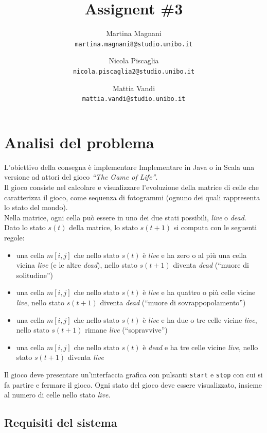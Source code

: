 \documentclass[a4paper]{article}
\title{\LARGE \bf
Assignent \#3
}
\author{
    Martina Magnani\\
    \texttt{martina.magnani8@studio.unibo.it}
    \and
    Nicola Piscaglia\\
    \texttt{nicola.piscaglia2@studio.unibo.it}
    \and
    Mattia Vandi\\
    \texttt{mattia.vandi@studio.unibo.it}
}
\date{}
\begin{document}
\maketitle

\section{Analisi del problema}\label{analisi-del-problema}

L'obiettivo della consegna è implementare Implementare in Java o in Scala una versione ad attori del gioco \textit{``The Game of Life''}.\\
Il gioco consiste nel calcolare e visualizzare l'evoluzione della matrice di celle che caratterizza il gioco, come sequenza di fotogrammi (ognuno dei quali rappresenta lo stato del mondo).\\
Nella matrice, ogni cella può essere in uno dei due stati possibili, \textit{live} o \textit{dead}.\\
Dato lo stato $s\left(t\right)$ della matrice, lo stato $s\left(t + 1\right)$ si computa con le seguenti regole:

\begin{itemize}
\item
  una cella $m\left[i,j\right]$ che nello stato $s\left(t\right)$ è \textit{live} e ha zero o al più una cella vicina \textit{live} (e le altre \textit{dead}), nello stato $s\left(t + 1\right)$ diventa \textit{dead} (``muore di solitudine'')
\item
  una cella $m\left[i,j\right]$ che nello stato $s\left(t\right)$ è \textit{live} e ha quattro o più celle vicine \textit{live}, nello stato $s\left(t + 1\right)$ diventa \textit{dead} (``muore di sovrappopolamento'')
\item
  una cella $m\left[i,j\right]$ che nello stato $s\left(t\right)$ è \textit{live} e ha due o tre celle vicine \textit{live}, nello stato $s\left(t + 1\right)$ rimane \textit{live} (``sopravvive'')
\item
  una cella $m\left[i,j\right]$ che nello stato $s\left(t\right)$ è \textit{dead} e ha tre celle vicine \textit{live}, nello stato $s\left(t + 1\right)$ diventa \textit{live}
\end{itemize}
Il gioco deve presentare un'interfaccia grafica con pulsanti \texttt{start} e \texttt{stop} con cui si fa partire e fermare il gioco.
Ogni stato del gioco deve essere visualizzato, insieme al numero di celle nello stato \textit{live}.

\subsection{Requisiti del sistema}\label{requisiti-del-sistema}
\end{document}
